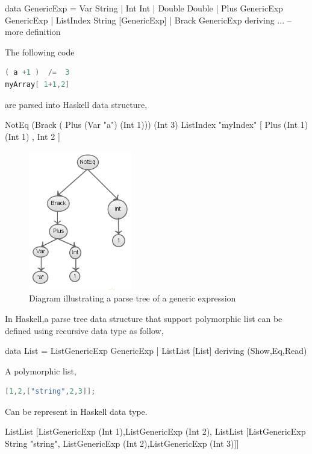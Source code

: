 \begin{hcode}
data GenericExp  =
		     Var String 
		   | Int Int
		   | Double Double
		   | Plus GenericExp GenericExp		   
		   | ListIndex String [GenericExp]
		   | Brack GenericExp  deriving 
		   ... -- more definition
\end{hcode}


The following code 
\begin{lstlisting}[language=java]
( a +1 )  /=  3
myArray[ 1+1,2] 
\end{lstlisting}

are parsed into Haskell data structure,

\begin{hcode}
NotEq  (Brack ( Plus (Var "a") (Int 1)))  (Int 3)
ListIndex "myIndex" [ Plus (Int 1) (Int 1) , Int 2 ] 
\end{hcode}


\begin{figure}[H]
  \centering
	\includegraphics[width=0.40\textwidth]{pic/c6/parse_tree_1.png}
	\caption{Diagram illustrating a parse tree of a generic expression}
\end{figure}


In Haskell,a parse tree data structure that support polymorphic list can be defined using recursive data type as follow, 
\begin{hcode}
data List = ListGenericExp GenericExp
			| ListList [List] deriving (Show,Eq,Read)  
\end{hcode}


A polymorphic list,
\begin{lstlisting}[language=java]
 [1,2,["string",2,3]];
\end{lstlisting}

Can be represent in Haskell data type.

\begin{hcode}
ListList  [ListGenericExp (Int 1),ListGenericExp (Int 2),
	ListList [ListGenericExp String "string",
		ListGenericExp (Int 2),ListGenericExp (Int 3)]] 
\end{hcode}



